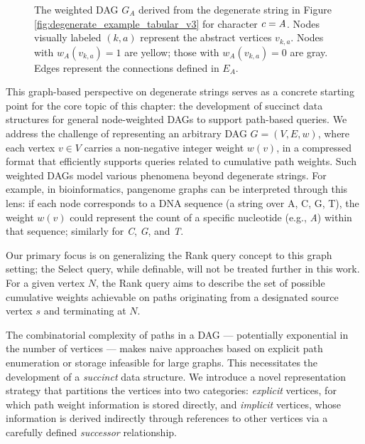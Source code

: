 \begin{figure}[htbp]
    \caption{The weighted DAG $G_A$ derived from the degenerate string in Figure \ref{fig:degenerate_example_tabular_v3} for character $c=\emph{A}$. Nodes visually labeled $(k,a)$ represent the abstract vertices $v_{k,a}$. Nodes with $w_A(v_{k,a})=1$ are yellow; those with $w_A(v_{k,a})=0$ are gray. Edges represent the connections defined in $E_A$.}
    \label{fig:degenerate_dag_horizontal_v3}
\end{figure}

This graph-based perspective on degenerate strings serves as a concrete starting point for the core topic of this chapter: the development of succinct data structures for general node-weighted DAGs to support path-based queries. We address the challenge of representing an arbitrary DAG $G=(V, E, w)$, where each vertex $v \in V$ carries a non-negative integer weight $w(v)$, in a compressed format that efficiently supports queries related to cumulative path weights. Such weighted DAGs model various phenomena beyond degenerate strings. For example, in bioinformatics, pangenome graphs can be interpreted through this lens: if each node corresponds to a DNA sequence (a string over {A, C, G, T}), the weight $w(v)$ could represent the count of a specific nucleotide (e.g., \emph{A}) within that sequence; similarly for \emph{C}, \emph{G}, and \emph{T}.

Our primary focus is on generalizing the Rank query concept to this graph setting; the Select query, while definable, will not be treated further in this work. For a given vertex $N$, the Rank query aims to describe the set of possible cumulative weights achievable on paths originating from a designated source vertex $s$ and terminating at $N$.

The combinatorial complexity of paths in a DAG — potentially exponential in the number of vertices — makes naive approaches based on explicit path enumeration or storage infeasible for large graphs. This necessitates the development of a \emph{succinct} data structure. We introduce a novel representation strategy that partitions the vertices into two categories: \emph{explicit} vertices, for which path weight information is stored directly, and \emph{implicit} vertices, whose information is derived indirectly through references to other vertices via a carefully defined \emph{successor} relationship.

